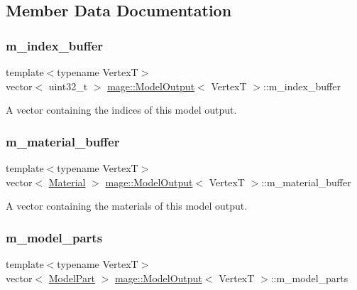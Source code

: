 \subsection{Member Data Documentation}
\hypertarget{structmage_1_1_model_output_afc6530c5fc47224b45d851e67dd5a306}{}\label{structmage_1_1_model_output_afc6530c5fc47224b45d851e67dd5a306} 
\subsubsection{\texorpdfstring{m\+\_\+index\+\_\+buffer}{m\_index\_buffer}}
{\footnotesize\ttfamily template$<$typename VertexT$>$ \\
vector$<$ uint32\+\_\+t $>$ \hyperlink{structmage_1_1_model_output}{mage\+::\+Model\+Output}$<$ VertexT $>$\+::m\+\_\+index\+\_\+buffer}

A vector containing the indices of this model output. \hypertarget{structmage_1_1_model_output_a3bfdb493d92a83b40a8b363a96e89a0c}{}\label{structmage_1_1_model_output_a3bfdb493d92a83b40a8b363a96e89a0c} 
\subsubsection{\texorpdfstring{m\+\_\+material\+\_\+buffer}{m\_material\_buffer}}
{\footnotesize\ttfamily template$<$typename VertexT$>$ \\
vector$<$ \hyperlink{structmage_1_1_material}{Material} $>$ \hyperlink{structmage_1_1_model_output}{mage\+::\+Model\+Output}$<$ VertexT $>$\+::m\+\_\+material\+\_\+buffer}

A vector containing the materials of this model output. \hypertarget{structmage_1_1_model_output_a86df369ff4959458ee6991c36e6aa01a}{}\label{structmage_1_1_model_output_a86df369ff4959458ee6991c36e6aa01a} 
\subsubsection{\texorpdfstring{m\+\_\+model\+\_\+parts}{m\_model\_parts}}
{\footnotesize\ttfamily template$<$typename VertexT$>$ \\
vector$<$ \hyperlink{structmage_1_1_model_part}{Model\+Part} $>$ \hyperlink{structmage_1_1_model_output}{mage\+::\+Model\+Output}$<$ VertexT $>$\+::m\+\_\+model\+\_\+parts}

